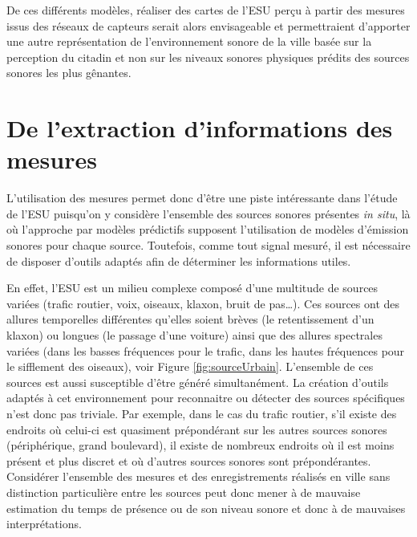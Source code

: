 De ces différents modèles, réaliser des cartes de l'ESU perçu à partir des mesures issus des réseaux de capteurs serait alors envisageable et permettraient d'apporter une autre représentation de l'environnement sonore de la ville basée sur la perception du citadin et non sur les niveaux sonores physiques prédits des sources sonores les plus gênantes.

\section{De l'extraction d'informations des mesures}

L'utilisation des mesures permet donc d'être une piste intéressante dans l'étude de l'ESU puisqu'on y considère l'ensemble des sources sonores présentes \textit{in situ}, là où l'approche par modèles prédictifs supposent l'utilisation de modèles d'émission sonores pour chaque source. 
Toutefois, comme tout signal mesuré, il est nécessaire de disposer d'outils adaptés afin de déterminer les informations utiles.

En effet, l'ESU est un milieu complexe composé d'une multitude de sources variées (trafic routier, voix, oiseaux, klaxon, bruit de pas\dots). Ces sources ont des allures temporelles différentes qu'elles soient brèves (le retentissement d'un klaxon) ou longues (le passage d'une voiture) ainsi que des allures spectrales variées (dans les basses fréquences pour le trafic, dans les hautes fréquences pour le sifflement des oiseaux), voir Figure \ref{fig:sourceUrbain}. L'ensemble de ces sources est aussi susceptible d'être généré simultanément. La création d'outils adaptés à cet environnement pour reconnaitre ou détecter des sources spécifiques n'est donc pas triviale. Par exemple, 
dans le cas du trafic routier, s'il existe des endroits où celui-ci est quasiment prépondérant sur les autres sources sonores (périphérique, grand boulevard), il existe de nombreux endroits où il est moins présent et plus discret et où d'autres sources sonores sont prépondérantes. Considérer l'ensemble des mesures et des enregistrements réalisés en ville sans distinction particulière entre les sources peut donc mener à de mauvaise estimation du temps de présence ou de son niveau sonore et donc à de mauvaises interprétations. 

